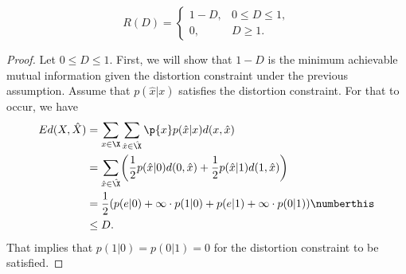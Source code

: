 \documentclass[
  coursecode={MTHE 477},
  assignmentname={Homework \homeworknumber},
  studentnumber=20053722,
  name={Bryan Hoang},
  draft,
]{
  ltxanswer%
}
\begin{document}
  \begin{questions}
    \setcounter{question}{\questionnumber}
    \addtocounter{question}{-1}
    \question[25]{}
    \begin{solution}
      \begin{claim}
        \begin{equation*}
          R(D) = \begin{cases}
            1 - D, &0 \le D \le 1, \\
            0,     &D \ge 1.
          \end{cases}
        \end{equation*}
        \begin{proof}
          Let \(0 \le D \le 1\). First, we will show that \(1 - D\) is the minimum achievable mutual information given the distortion constraint under the previous assumption. Assume that \(p(\hat{x}|x)\) satisfies the distortion constraint. For that to occur, we have
          \begin{align*}
            Ed(X,\hat{X}) &= \sum_{x\in\X} \sum_{\hat{x}\in\hat{\X}} \p{x} p(\hat{x}|x) d(x,\hat{x})                                               \\
                          &= \sum_{\hat{x}\in\hat{\X}} \biggl(\frac{1}{2} p(\hat{x}|0) d(0,\hat{x}) + \frac{1}{2} p(\hat{x}|1) d(1,\hat{x})\biggr) \\
                          &= \frac{1}{2} (p(e|0) + \infty \cdot p(1|0) + p(e|1) + \infty \cdot p(0|1))\numberthis\label{eq:expected-distortion}    \\
                          &\le D.
          \end{align*}
          That implies that \(p(1|0) = p(0|1) = 0\) for the distortion constraint to be satisfied.


\end{proof}
\end{claim}
\end{solution}
\end{questions}
\end{document}
